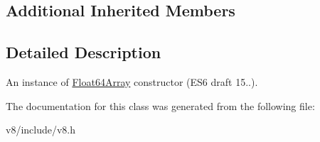 \subsection*{Additional Inherited Members}


\subsection{Detailed Description}
An instance of \mbox{\hyperlink{classv8_1_1Float64Array}{Float64\+Array}} constructor (E\+S6 draft 15..). 

The documentation for this class was generated from the following file\+:\begin{DoxyCompactItemize}
\item 
v8/include/v8.\+h\end{DoxyCompactItemize}
